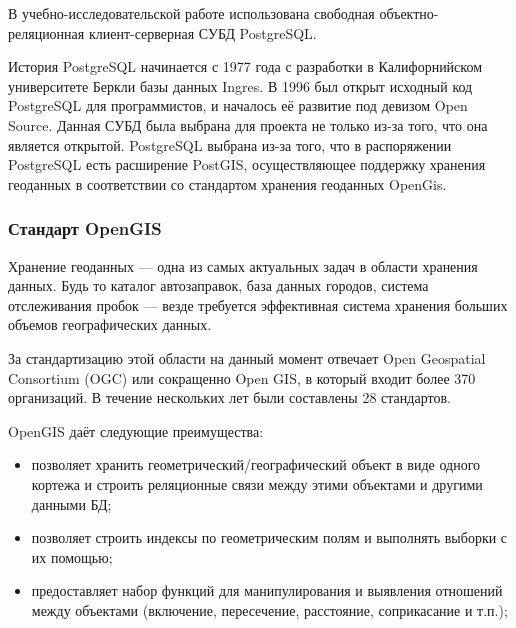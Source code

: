 \documentclass[12pt,a4paper,oneside]{article} %
\begin{document}
В учебно-исследовательской работе использована свободная \linebreak
объектно-реляционная клиент-серверная СУБД PostgreSQL.

История PostgreSQL начинается с 1977 года с \linebreak
разработки в Калифорнийском университете Беркли базы данных Ingres. \linebreak
В 1996 был открыт исходный код PostgreSQL для программистов, и \linebreak
началось её развитие под девизом Open Source. Данная СУБД \linebreak
была выбрана для проекта не только из-за того, что она \linebreak
является открытой. PostgreSQL выбрана из-за того, что в \linebreak
распоряжении PostgreSQL есть расширение PostGIS, осуществляющее \linebreak
поддержку хранения геоданных в соответствии со стандартом \linebreak
хранения геоданных OpenGis.

\newpage
\subsubsection{Стандарт OpenGIS}

Хранение геоданных — одна из самых актуальных задач в области хранения \linebreak
данных. Будь то каталог автозаправок, база данных городов, система \linebreak
отслеживания пробок — везде требуется эффективная система хранения \linebreak
больших объемов географических данных.

За стандартизацию этой области на данный момент отвечает \linebreak
Open Geospatial Consortium (OGC) или сокращенно Open GIS, в который \linebreak
входит более 370 организаций. В течение нескольких лет были \linebreak
составлены 28 стандартов.

OpenGIS даёт следующие преимущества:

\begin{itemize}
\item позволяет хранить геометрический/географический объект в виде \linebreak
одного кортежа и строить реляционные связи между этими объектами \linebreak
и другими данными БД;
\item позволяет строить индексы по геометрическим полям и выполнять \linebreak
выборки с их помощью;
\item предоставляет набор функций для манипулирования и выявления \linebreak
отношений между объектами (включение, пересечение, расстояние, \linebreak
соприкасание и т.п.);
\end{itemize}
\end{document}
